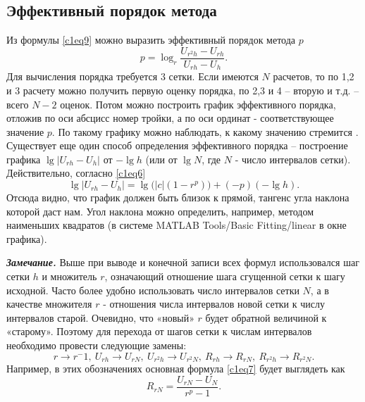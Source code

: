 \subsection{Эффективный порядок метода}
Из формулы \eqref{c1eq9} можно выразить эффективный порядок метода $p$
\begin{equation} \label{c1eq13}
	p = \log_r \frac{U_{r^2h} - U_{rh}}{U_{rh} - U_h}.
\end{equation}
Для вычисления порядка требуется 3 сетки. Если имеются $N$ расчетов, то по 1,2 и 3 расчету можно получить первую оценку порядка, по 2,3 и 4 – вторую и т.д. – всего $N-2$ оценок. Потом можно построить график эффективного порядка, отложив по оси абсцисс номер тройки, а по оси ординат - соответствующее значение $p$. По такому графику можно наблюдать, к какому значению стремится .
Существует еще один способ определения эффективного порядка – построение графика $\lg\left| U_{rh} - U_h \right|$ от $-\lg h$ (или от $\lg N$, где $N$ - число интервалов сетки). Действительно, согласно \eqref{c1eq6}
\begin{equation} \label{c1eq14}
	\lg \left| U_{rh} - U_h \right| = \lg \big( \left| c \right| \left( 1 - r^p \right) \big) + \left( -p \right) \left( - \lg h \right).
\end{equation}
Отсюда видно, что график должен быть близок к прямой, тангенс угла наклона которой даст нам. Угол наклона можно определить, например, методом наименьших квадратов (в системе MATLAB Tools/Basic Fitting/linear в окне графика). 

\textit{\textbf{Замечание.}} Выше при выводе и конечной записи всех формул использовался шаг сетки $h$ и множитель $r$, означающий отношение шага сгущенной сетки к шагу исходной. Часто более удобно использовать число интервалов сетки $N$, а в качестве множителя $r$ - отношения числа интервалов новой сетки к числу интервалов старой. Очевидно, что «новый» $r$ будет обратной величиной к «старому». Поэтому для перехода от шагов сетки к  числам интервалов необходимо провести следующие замены:
\begin{equation} \label{c1eq15}
	r \rightarrow r^-1, \ U_{rh} \rightarrow U_{rN}, \ U_{r^2h} \rightarrow U_{r^2N}, \ R_{rh} \rightarrow R_{rN}, \ R_{r^2h} \rightarrow R_{r^2N}.
\end{equation}
Например, в этих обозначениях основная формула \eqref{c1eq7} будет выглядеть как
\begin{equation} \label{c1eq16}
	R_{rN} = \frac{U_{rN} - U_N}{r^p - 1}.
\end{equation}

